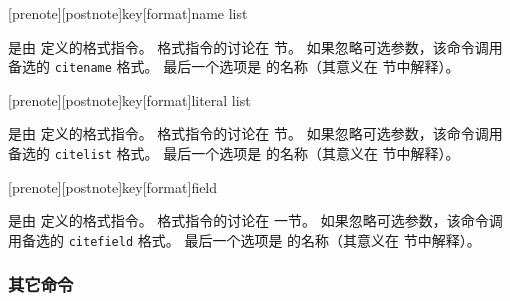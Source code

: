 \begin{ltxsyntax}

[prenote][postnote]{key}[format]{name list}


 是由  定义的格式指令。
格式指令的讨论在  节。
如果忽略可选参数，该命令调用备选的 \texttt{citename} 格式。
最后一个选项是  的名称（其意义在  节中解释）。

[prenote][postnote]{key}[format]{literal list}


 是由  定义的格式指令。
格式指令的讨论在  节。
如果忽略可选参数，该命令调用备选的 \texttt{citelist} 格式。
最后一个选项是  的名称（其意义在  节中解释）。

[prenote][postnote]{key}[format]{field}


 是由  定义的格式指令。
格式指令的讨论在  一节。
如果忽略可选参数，该命令调用备选的 \texttt{citefield} 格式。
最后一个选项是  的名称（其意义在  节中解释）。

\end{ltxsyntax}

\subsubsection{其它命令}%
\label{use:cit:msc}

